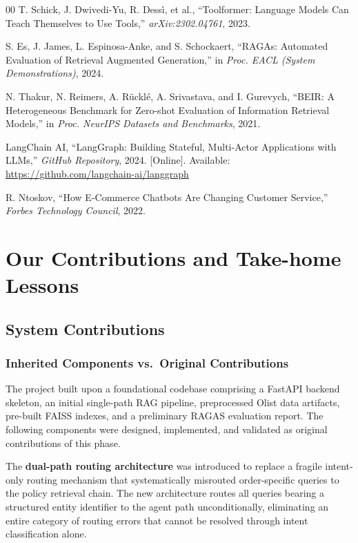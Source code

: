 \documentclass[conference]{IEEEtran}
\begin{document}
\begin{thebibliography}{00}
 T. Schick, J. Dwivedi-Yu, R. Dess\`{i}, et al., ``Toolformer: Language Models Can Teach Themselves to Use Tools,'' \textit{arXiv:2302.04761}, 2023.

 S. Es, J. James, L. Espinosa-Anke, and S. Schockaert, ``RAGAs: Automated Evaluation of Retrieval Augmented Generation,'' in \textit{Proc. EACL (System Demonstrations)}, 2024.

 N. Thakur, N. Reimers, A. R\"uckl\'e, A. Srivastava, and I. Gurevych, ``BEIR: A Heterogeneous Benchmark for Zero-shot Evaluation of Information Retrieval Models,'' in \textit{Proc. NeurIPS Datasets and Benchmarks}, 2021.

 LangChain AI, ``LangGraph: Building Stateful, Multi-Actor Applications with LLMs,'' \textit{GitHub Repository}, 2024. [Online]. Available: \url{https://github.com/langchain-ai/langgraph}

 R. Ntoskov, ``How E-Commerce Chatbots Are Changing Customer Service,'' \textit{Forbes Technology Council}, 2022.

\end{thebibliography}
\vspace{12pt}

\section*{Our Contributions and Take-home Lessons}

\subsection*{System Contributions}

\subsubsection*{Inherited Components vs.\ Original Contributions}
The project built upon a foundational codebase comprising a FastAPI backend skeleton,
an initial single-path RAG pipeline, preprocessed Olist data artifacts, pre-built
FAISS indexes, and a preliminary RAGAS evaluation report. The following components
were designed, implemented, and validated as original contributions of this phase.

The \textbf{dual-path routing architecture} was introduced to replace a fragile
intent-only routing mechanism that systematically misrouted order-specific queries
to the policy retrieval chain. The new architecture routes all queries bearing a
structured entity identifier to the agent path unconditionally, eliminating an
entire category of routing errors that cannot be resolved through intent
classification alone.
\end{document}
